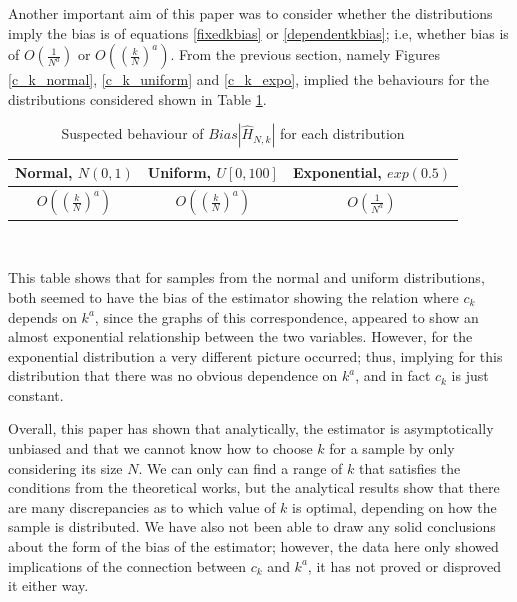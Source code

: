 \documentclass[12pt]{report}
\begin{document}
Another important aim of this paper was to consider whether the distributions imply the bias is of equations \ref{fixedkbias} or \ref{dependentkbias}; i.e, whether bias is of $O \left( \frac{1}{N^{a}} \right)$ or $O\left( \left( \frac{k}{N} \right)^{a} \right)$. From the previous section, namely Figures \ref{c_k_normal}, \ref{c_k_uniform} and \ref{c_k_expo}, implied the behaviours for the distributions considered shown in Table \ref{distribution_comparison}.

\begin{table}
\caption{Suspected behaviour of $Bias |\hat{H}_{N, k} |$ for each distribution} \label{distribution_comparison}
\begin{center}
\begin{tabular}{| c | c | c|} 
\toprule
Normal, $N(0,1)$ & Uniform, $U[0,100]$ & Exponential, $exp(0.5)$ \\
\midrule[1pt]
$O\left( \left( \frac{k}{N} \right)^{a} \right)$ & $O\left( \left( \frac{k}{N} \right)^{a} \right)$ &  $O \left( \frac{1}{N^{a}} \right)$ \\
\hline
\end{tabular}
\\[10pt]
\end{center}
\end{table}

This table shows that for samples from the normal and uniform distributions, both seemed to have the bias of the estimator showing the relation where $c_{k}$ depends on $k^a$, since the graphs of this correspondence, appeared to show an almost exponential relationship between the two variables. However, for the exponential distribution a very different picture occurred; thus, implying for this distribution that there was no obvious dependence on $k^a$, and in fact $c_{k}$ is just constant. 

Overall, this paper has shown that analytically, the estimator is asymptotically unbiased and that we cannot know how to choose $k$ for a sample by only considering its size $N$. We can only can find a range of $k$ that satisfies the conditions from the theoretical works, but the analytical results show that there are many discrepancies as to which value of $k$ is optimal, depending on how the sample is distributed. We have also not been able to draw any solid conclusions about the form of the bias of the estimator; however, the data here only showed implications of the connection between $c_{k}$ and $k^a$, it has not proved or disproved it either way.
\end{document}
